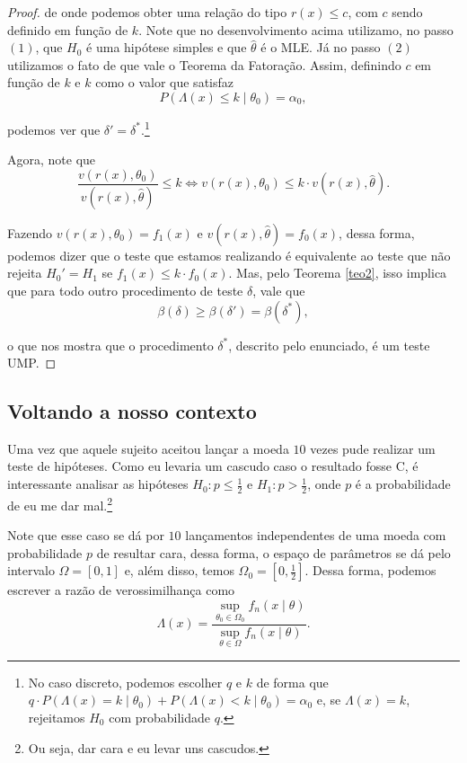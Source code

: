 \documentclass{article}
\begin{document}
\begin{proof}
    \noindent de onde podemos obter uma relação do tipo $r(x) \leq c$, com $c$ sendo definido em função de $k$. Note que no desenvolvimento acima utilizamo, no passo $(1)$, que $H_0$ é uma hipótese simples e que $\hat{\theta}$ é o MLE. Já no passo $(2)$ utilizamos o fato de que vale o Teorema da Fatoração. Assim, definindo $c$ em função de $k$ e $k$ como o valor que satisfaz
    \[P\left(\Lambda(x) \leq k \mid \theta_0\right) = \alpha_0,\]
    
    \noindent podemos ver que $\delta' = \delta^*$.\footnote{No caso discreto, podemos escolher $q$ e $k$ de forma que $q\cdot P\left(\Lambda(x) = k \mid \theta_0\right) + P\left(\Lambda(x) < k \mid \theta_0\right) = \alpha_0$ e, se $\Lambda(x) = k$, rejeitamos $H_0$ com probabilidade $q$.}
    
    Agora, note que
    \[\dfrac{v\left(r(x), \theta_0\right)}{v\left(r(x), \hat{\theta}\right)} \leq k \iff v\left(r(x), \theta_0\right) \leq k\cdot v\left(r(x), \hat{\theta}\right).\]
    
    Fazendo $v\left(r(x), \theta_0\right) = f_1(x)$ e $v\left(r(x), \hat{\theta}\right) = f_0(x)$, dessa forma, podemos dizer que o teste que estamos realizando é equivalente ao teste que não rejeita $H_0' = H_1$ se $f_1(x) \leq k\cdot f_0(x)$. Mas, pelo Teorema \ref{teo2}, isso implica que para todo outro procedimento de teste $\delta$, vale que 
    \[\beta(\delta) \geq \beta(\delta') = \beta(\delta^*),\]
    
    \noindent o que nos mostra que o procedimento $\delta^*$, descrito pelo enunciado, é um teste UMP.
\end{proof}

\subsection*{Voltando a nosso contexto}

Uma vez que aquele sujeito aceitou lançar a moeda $10$ vezes pude realizar um teste de hipóteses. Como eu levaria um cascudo caso o resultado fosse C, é interessante analisar as hipóteses $H_0 : p \leq \frac{1}{2}$ e $H_1 : p > \frac{1}{2}$, onde $p$ é a probabilidade de eu me dar mal.\footnote{Ou seja, dar cara e eu levar uns cascudos.}

Note que esse caso se dá por $10$ lançamentos independentes de uma moeda com probabilidade $p$ de resultar cara, dessa forma, o espaço de parâmetros se dá pelo intervalo $\Omega = [0, 1]$ e, além disso, temos $\Omega_0 = \left[0, \frac{1}{2}\right]$. Dessa forma, podemos escrever a razão de verossimilhança como
\[\Lambda(x) = \dfrac{\sup_{\theta_0 \in \Omega_0} f_n(x \mid \theta)}{\sup_{\theta \in \Omega} f_n(x \mid \theta)}.\]
\end{document}

